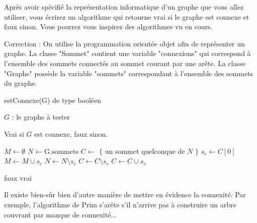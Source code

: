 \documentclass[a4paper,11pt]{article}
\begin{document}
Après avoir spécifié la représentation informatique d'un graphe que vous allez utiliser, vous écrirez un algorithme qui retourne vrai si le graphe est connexe et faux sinon. Vous pourrez vous inspirez des algorithmes vu en cours.

Correction : On utilise la programmation orientée objet afin de représenter un graphe. La classe "Sommet" contient une variable "connexions" qui correspond à l'ensemble des sommets connectés au sommet courant par une arête. La classe "Graphe" possède la variable "sommets" correspondant à l'ensemble des sommets du graphe.

\begin{algorithm}
  \caption{estConnexe(G) de type booléen}
  \begin{algorithmic}[1]
\Require 

  $G$ : le graphe à tester

\Ensure 

  Vrai si $G$ est connexe, faux sinon.

\Begin
  \State {}
  \State $M \leftarrow \emptyset$
  \State {}
  \State $N \leftarrow \text{G.sommets}$
  \State {}
  \State $C \leftarrow$ $\{$ un sommet quelconque de $N$ $\}$
      \State $s_c \leftarrow C[0]$
      \State $M \leftarrow M \cup s_c$
      \State $N \leftarrow N \setminus s_c$
      \State $C \leftarrow C \setminus s_c$
              \State $C \leftarrow C \cup s_v$
          \EndIf
      \EndFor
  \EndWhile

      \State {}
      \State {}
      \State \Return faux
  \EndIf
  \State \Return vrai
\EndBegin
  \end{algorithmic}
\end{algorithm}

Il existe bien-sûr bien d'autre manière de mettre en évidence la connexité. Par exemple, l'algorithme de Prim s'arête s'il n'arrive pas à construire un arbre couvrant par manque de connexité...
\end{document}
